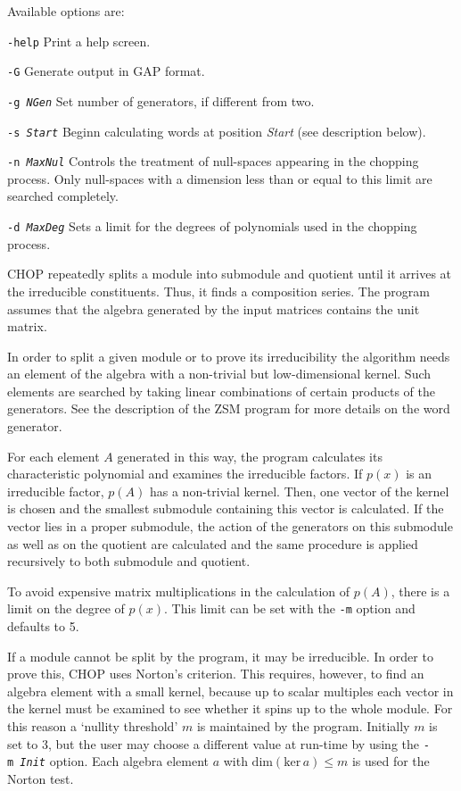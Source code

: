 Available options are:
\begin{list}{}{\leftmargin 1cm}
\item[{\tt -help}\hfill]
    Print a help screen.
\item[{\tt -G}\hfill]
    Generate output in GAP format.
\item[{\tt -g {\it NGen}}\hfill]
    Set number of generators, if different from two.
\item[{\tt -s {\it Start}}\hfill]
    Beginn calculating words at position {\it Start} (see
    description below).
\item[{\tt -n {\it MaxNul}}\hfill]
    Controls the treatment of null-spaces appearing in the chopping
    process. Only null-spaces with a dimension less than or equal to
    this limit are searched completely.
\item[{\tt -d {\it MaxDeg}}\hfill]
    Sets a limit for the degrees of polynomials used in the chopping
    process.
\end{list}

CHOP repeatedly splits a module into submodule and quotient
until it arrives at the irreducible constituents. Thus, it finds a
composition series. The program assumes that the algebra generated
by the input matrices contains the unit matrix.

In order to split a given module or to prove its irreducibility the
algorithm needs an element of the algebra with a non-trivial but
low-dimensional kernel. Such elements are searched by taking linear
combinations of certain products of the generators.
See the description of the ZSM program for more details on the
word generator.

For each element $A$ generated in this way, the program calculates
its characteristic polynomial and examines the irreducible factors.
If $p(x)$ is an irreducible factor, $p(A)$ has a non-trivial kernel.
Then, one vector of the kernel is chosen and the smallest submodule
containing this vector is calculated.
If the vector lies in a proper submodule, the action of the generators
on this submodule as well as on the quotient are calculated and
the same procedure is applied recursively to both submodule and
quotient.

To avoid expensive matrix multiplications in the calculation of $p(A)$,
there is a limit on the degree of $p(x)$. This limit can be set with
the \verb"-m" option and defaults to 5.

If a module cannot be split by the program, it may be irreducible.
In order to prove this, CHOP uses Norton's criterion. This
requires, however, to find an algebra element with a small kernel,
because up to scalar multiples each vector in the kernel must be
examined to see whether it spins up to the whole module. For this
reason a `nullity threshold' $m$ is maintained by the program.
Initially $m$ is set to 3, but the user may choose a different value
at run-time by using the {\tt -m~{\it Init}} option. Each algebra
element
$a$ with $\mbox{dim}(\mbox{ker}\,a)\leq m$ is used for the Norton test.

